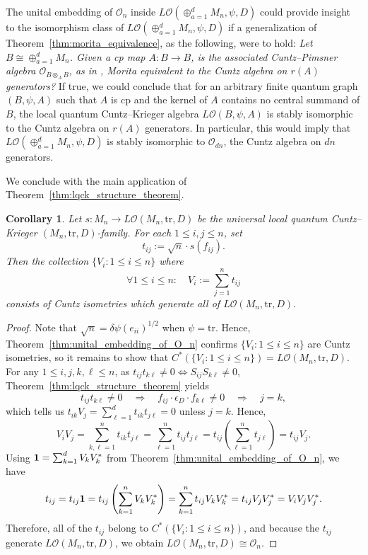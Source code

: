 \documentclass[11pt]{article}
\theoremstyle{plain}
\newtheorem{corollary}[lemma]{Corollary}
\theoremstyle{nonumberplain}
\theoremstyle{plain}
\theoremstyle{nonumberplain}
\newtheorem{proof}{Proof.}
\newcommand\1{{\bf 1}}
\newcommand\cO{{\mathcal O}}
\newcommand{\tr}{\text{tr}} %
\newcommand{\<}{\left\langle}
\renewcommand{\>}{\right\rangle}
\begin{document}

The unital embedding of $\cO_n$ inside $L\cO(\oplus_{a=1}^d M_n,\psi,D)$ could provide insight to the isomorphism class of $L\cO(\oplus_{a=1}^d M_n,\psi,D)$ if a generalization of Theorem~\ref{thm:morita_equivalence}, as the following, were to hold: {\em Let $B\cong \oplus_{a=1}^d M_n$. Given a cp map $A:B\to B$, is the associated Cuntz--Pimsner algebra $\cO_{B\otimes_A B}$, as in \cite{Marrero-Muhly05}, Morita equivalent to the Cuntz algebra on $r(A)$ generators?} If true, we could conclude that for an arbitrary finite quantum graph $(B,\psi,A)$ such that $A$ is cp and the kernel of $A$ contains no central summand of $B$, the local quantum Cuntz--Krieger algebra $L\cO(B,\psi,A)$ is stably isomorphic to the Cuntz algebra on $r(A)$ generators. In particular, this would imply that $L\cO(\oplus_{a=1}^d M_n,\psi,D)$ is stably isomorphic to $\cO_{dn}$, the Cuntz algebra on $dn$ generators.

We conclude with the main application of Theorem~\ref{thm:lqck_structure_theorem}.

\begin{corollary}\label{cor:cuntz_isometries_for_L(M_n-tr-D}
    Let $s:M_n\to L\cO(M_n,\tr,D)$ be the universal local quantum Cuntz--Krieger $(M_n,\tr,D)$-family. For each $1\leq i,j \leq n$, set \[t_{ij}:=\sqrt{n}\cdot s(f_{ij}).\] Then the collection $\{V_i:1\leq i\leq n\}$ where 
     \[
     \forall 1\leq i\leq n: \quad
     V_i
     :=\sum_{j=1}^n t_{ij}
     \] consists of Cuntz isometries which generate all of $L\cO(M_n,\tr,D).$
\end{corollary}
    
\begin{proof}
Note that $\sqrt{n} = \delta \psi(e_{ii})^{1/2}$ when $\psi=\tr$. Hence, Theorem~\ref{thm:unital_embedding_of_O_n} confirms $\{V_i:1\leq i \leq n\}$ are Cuntz isometries, so it remains to show that $C^*(\{V_i:1\leq i \leq n\})=L\cO(M_n,\tr,D).$ For any $1\leq i,j,k,\ell\leq n$, as $t_{ij}t_{k\ell}\neq 0\iff 
S_{ij}S_{k\ell} \neq 0$, Theorem~\ref{thm:lqck_structure_theorem} yields
\[
t_{ij}t_{k\ell}\neq 0 
\quad
\Longrightarrow 
\quad
f_{ij}\cdot \epsilon_D \cdot f_{k\ell}\neq 0 
\quad
{\Longrightarrow}
\quad
j=k,
\]
which tells us $t_{ik}V_j = \sum_{\ell=1}^d t_{ik}t_{j\ell} = 0$ unless $j=k.$ Hence,
\[V_iV_j
=\sum_{k,\ell=1}^n t_{ik}t_{j\ell}
=\sum_{\ell=1}^n t_{ij}t_{j\ell}
=t_{ij}\left(\sum_{\ell=1}^n t_{j\ell}\right)
=t_{ij}V_j.
\]
Using 
$
{\bf 1}
=
\sum_{k=1}^d V_kV_k^*
$
from Theorem~\ref{thm:unital_embedding_of_O_n}, we have
\[
    t_{ij}
    =t_{ij}{\bf 1}
    =t_{ij}\left(\sum_{k=1}^nV_kV_k^*\right)
    =\sum_{k=1}^n t_{ij}V_kV_k^*
    =t_{ij}V_jV_j^*
    =V_iV_jV_j^*.
\] 
Therefore, all of the $t_{ij}$ belong to $C^*(\{V_i:1\leq i\leq n\})$, and because the $t_{ij}$ generate $L\cO(M_n,\tr,D)$, we obtain
$L\cO(M_n,\tr,D)
\cong \cO_n$.%
\end{proof}
\end{document}
